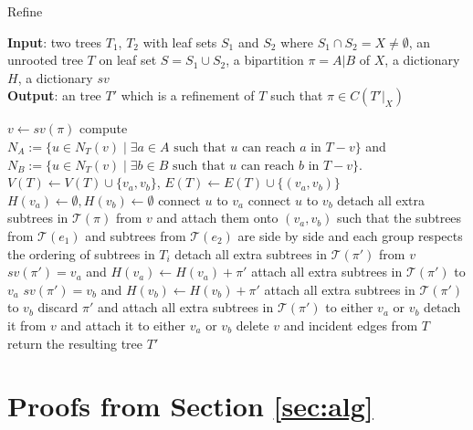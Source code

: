 \documentclass{article}
\begin{document}
\begin{algorithm}
    \caption{Refine}
    \label{alg:refine}
    \textbf{Input}: two trees $T_1$, $T_2$ with leaf sets $S_1$ and $S_2$ where $S_1 \cap S_2 = X \neq \emptyset$, an unrooted tree $T$ on leaf set $S = S_1 \cup S_2$, a bipartition $\pi = A|B$ of $X$, a dictionary $H$, a dictionary $sv$\\
    \textbf{Output}: an tree $T'$ which is a refinement of $T$ such that $\pi \in C(T'|_X)$ 
    \begin{algorithmic}[1]
        \State $v \gets sv(\pi)$
        \State compute $N_A:= \{u \in N_T(v) \mid \text{$\exists a \in A$ such that $u$ can reach $a$ in $T-v$}\}$ and $N_B:= \{u \in N_T(v) \mid \text{$\exists b \in B$ such that $u$ can reach $b$ in $T-v$}\}$.
        \State $V(T) \gets V(T) \cup \{v_a, v_b\}$, $E(T) \gets E(T) \cup \{(v_a,v_b)\}$
        \State $H(v_a) \gets \emptyset, H(v_b) \gets \emptyset$
             connect $u$ to $v_a$
            \Else{} connect $u$ to $v_b$
            \EndIf
        \EndFor
        \State detach all extra subtrees in $\mathcal{T}(\pi)$ from $v$ and attach them onto $(v_a,v_b)$ such that the subtrees from $\mathcal{T}(e_1)$ and subtrees from $\mathcal{T}(e_2)$ are side by side and each group respects the ordering of subtrees in $T_i$
            \State detach all extra subtrees in $\mathcal{T}(\pi')$ from $v$ 
                \State $sv(\pi') = v_a$ and $H(v_a) \gets H(v_a) + \pi'$
                \State attach all extra subtrees in $\mathcal{T}(\pi')$ to $v_a$
                \State $sv(\pi') = v_b$ and $H(v_b) \gets H(v_b) + \pi'$
                \State attach all extra subtrees in $\mathcal{T}(\pi')$ to $v_b$
            \Else{} 
                \State discard $\pi'$ and attach all extra subtrees in $\mathcal{T}(\pi')$ to either $v_a$ or $v_b$ 
            \EndIf
        \EndFor
            \State detach it from $v$ and attach it to either $v_a$ or $v_b$
        \EndFor
        \State delete $v$ and incident edges from $T$
        \State return the resulting tree $T'$
    \end{algorithmic}
\end{algorithm}

\appendix
\section{Proofs from Section \ref{sec:alg}}
\end{document}
